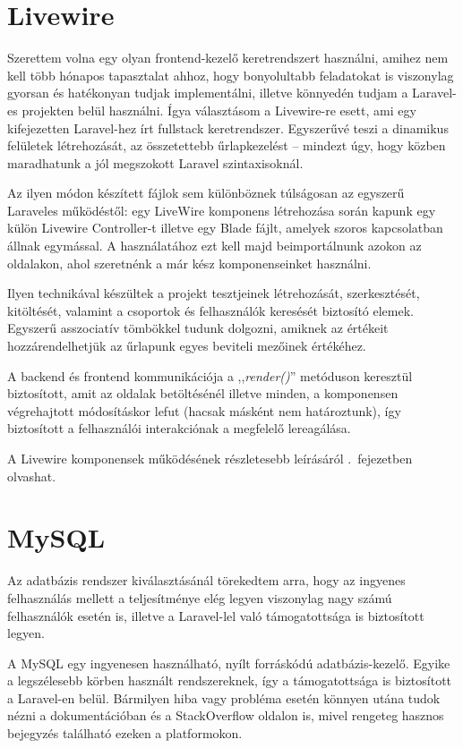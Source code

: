 \documentclass[
]{thesis-ekf}
\theoremstyle{definition}
\theoremstyle{remark}
\begin{document}
	   \section{Livewire}
            Szerettem volna egy olyan frontend-kezelő keretrendszert használni, amihez nem kell több hónapos tapasztalat ahhoz, hogy bonyolultabb feladatokat is viszonylag gyorsan és hatékonyan tudjak implementálni, illetve könnyedén tudjam a Laravel-es projekten belül használni. Ígya választásom a Livewire-re\cite{LaravelLivewire} esett, ami egy kifejezetten Laravel-hez írt fullstack keretrendszer. Egyszerűvé teszi a dinamikus felületek létrehozását, az összetettebb űrlapkezelést -- mindezt úgy, hogy közben maradhatunk a jól megszokott Laravel szintaxisoknál. 
        
            Az ilyen módon készített fájlok sem különböznek túlságosan az egyszerű Laraveles működéstől: egy LiveWire komponens létrehozása során kapunk egy külön Livewire Controller-t illetve egy Blade fájlt, amelyek szoros kapcsolatban állnak egymással. A használatához ezt kell majd beimportálnunk azokon az oldalakon, ahol szeretnénk a már kész komponenseinket használni. 
            
            Ilyen technikával készültek a projekt tesztjeinek létrehozását, szerkesztését, kitöltését, valamint a csoportok és felhasználók keresését biztosító elemek. Egyszerű asszociatív tömbökkel tudunk dolgozni, amiknek az értékeit hozzárendelhetjük az űrlapunk egyes beviteli mezőinek értékéhez. 
            
            A backend és frontend kommunikációja a ,,\emph{render()}'' metóduson keresztül biztosított, amit az oldalak betöltésénél illetve minden, a komponensen végrehajtott módosításkor lefut (hacsak másként nem határoztunk), így biztosított a felhasználói interakciónak a megfelelő lereagálása. 
            
            A Livewire komponensek működésének részletesebb leírásáról \az{\ref{Livewire}}.~fejezetben olvashat.
            
	   \section{MySQL}
	        Az adatbázis rendszer kiválasztásánál törekedtem arra, hogy az ingyenes felhasználás mellett a teljesítménye elég legyen viszonylag nagy számú felhasználók esetén is, illetve a Laravel-lel való támogatottsága is biztosított legyen. 
        
            A MySQL egy ingyenesen használható, nyílt forráskódú adatbázis-kezelő. Egyike a legszélesebb körben használt rendszereknek, így a támogatottsága is biztosított a Laravel-en belül. Bármilyen hiba vagy probléma esetén könnyen utána tudok nézni a dokumentációban és a StackOverflow oldalon is, mivel rengeteg hasznos bejegyzés található ezeken a platformokon.
\end{document}
